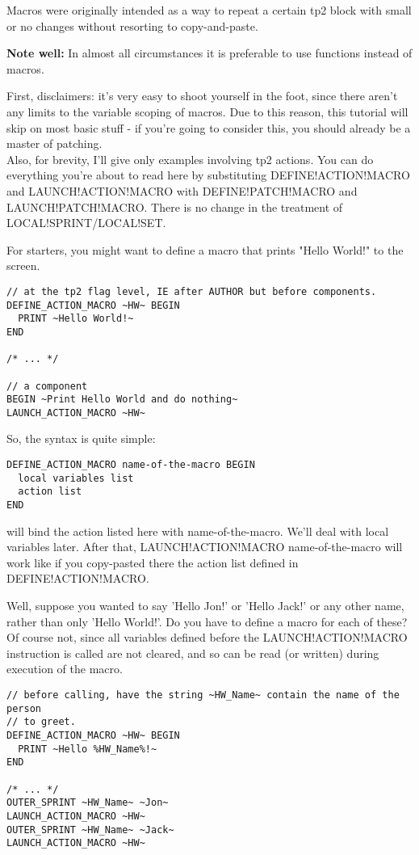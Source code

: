 \documentclass{article}
\begin{document}
Macros were originally intended as a way to repeat a certain tp2 block
with small or no changes without resorting to copy-and-paste.

\textbf{Note well:} In almost all circumstances it is preferable to use functions instead
of macros.

First, disclaimers: it's very easy to shoot yourself in the foot, since
there aren't any limits to the variable scoping of macros. Due to this reason, this tutorial
will skip on most basic stuff - if you're going to consider this, you should
already be a master of patching. \\
Also, for brevity, I'll give only examples involving tp2 actions. You can
do everything you're about to read here by substituting DEFINE!ACTION!MACRO
and LAUNCH!ACTION!MACRO with DEFINE!PATCH!MACRO and LAUNCH!PATCH!MACRO. There
is no change in the treatment of LOCAL!SPRINT/LOCAL!SET.

For starters, you might want to define a macro that prints "Hello World!" to
the screen.

\begin{verbatim}
// at the tp2 flag level, IE after AUTHOR but before components.
DEFINE_ACTION_MACRO ~HW~ BEGIN
  PRINT ~Hello World!~
END

/* ... */

// a component
BEGIN ~Print Hello World and do nothing~
LAUNCH_ACTION_MACRO ~HW~
\end{verbatim}

So, the syntax is quite simple:
\begin{verbatim}
DEFINE_ACTION_MACRO name-of-the-macro BEGIN
  local variables list
  action list
END
\end{verbatim}
will bind the action listed here with name-of-the-macro. We'll deal with
local variables later. After that, LAUNCH!ACTION!MACRO name-of-the-macro
will work like if you copy-pasted there the action list defined in
DEFINE!ACTION!MACRO.

Well, suppose you wanted to say 'Hello Jon!' or 'Hello Jack!' or any other
name, rather than only 'Hello World!'. Do you have to define a macro for each
of these? Of course not, since all variables defined before the LAUNCH!ACTION!MACRO
instruction is called are not cleared, and so can be read (or written) during execution of the macro.

\begin{verbatim}
// before calling, have the string ~HW_Name~ contain the name of the person
// to greet.
DEFINE_ACTION_MACRO ~HW~ BEGIN
  PRINT ~Hello %HW_Name%!~
END

/* ... */
OUTER_SPRINT ~HW_Name~ ~Jon~
LAUNCH_ACTION_MACRO ~HW~
OUTER_SPRINT ~HW_Name~ ~Jack~
LAUNCH_ACTION_MACRO ~HW~
\end{verbatim}
\end{document}
